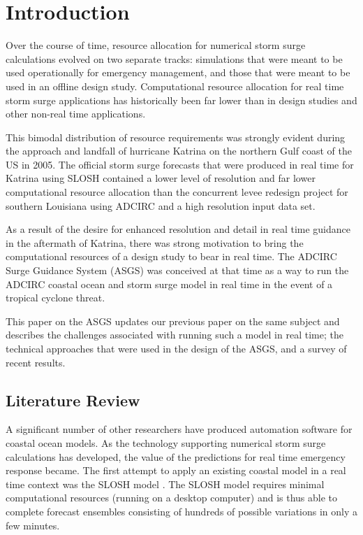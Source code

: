 \documentclass[jmse,article,submit,moreauthors,pdftex,12pt,a4paper]{mdpi}
\begin{document}

\section{Introduction}


Over the course of time, resource allocation for numerical storm 
surge calculations evolved on two separate tracks: simulations that 
were meant to be used operationally for emergency management, and 
those that were meant to be used in an offline design study. 
Computational resource allocation for real time storm surge 
applications has historically been far lower than in design studies 
and other non-real time applications. 

This bimodal distribution of resource requirements was strongly 
evident during the approach and landfall of hurricane Katrina on the 
northern Gulf coast of the US in 2005. The official storm surge 
forecasts that were produced in real time for Katrina using SLOSH 
contained a lower level of resolution and far lower computational 
resource allocation than the concurrent levee redesign project for 
southern Louisiana using ADCIRC and a high resolution input data set.

As a result of the desire for enhanced resolution and detail in real 
time guidance in the aftermath of Katrina, there was strong 
motivation to bring the computational resources of a design study to 
bear in real time. The ADCIRC Surge Guidance System (ASGS) was 
conceived at that time as a way to run the ADCIRC coastal ocean and 
storm surge model in real time in the event of a tropical cyclone 
threat. 

This paper on the ASGS updates our previous paper on the same 
subject \cite {FlemingJG2008} and describes the challenges 
associated with running such a model in real time; the technical 
approaches that were used in the design of the ASGS, and a survey of 
recent results. 


\subsection{Literature Review}

A significant number of other researchers have produced automation 
software for coastal ocean models. As the technology supporting 
numerical storm surge calculations has developed, the value of the 
predictions for real time emergency response became. The first 
attempt to apply an existing coastal model in a real time context 
was the SLOSH model \cite{JelesnianskiCP1992}. The SLOSH model
requires minimal computational resources (running on a desktop
computer) and is thus able to complete forecast ensembles consisting
of hundreds of possible variations in only a few minutes.
\end{document}
